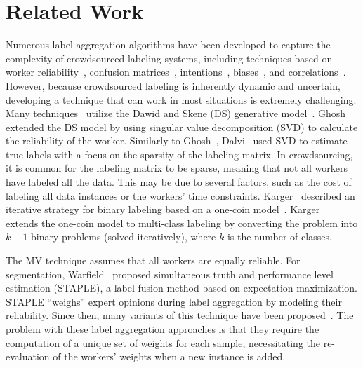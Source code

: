 \section{Related Work}\label{sec:crowd.relatedwork}
Numerous label aggregation algorithms have been developed to capture the complexity of crowdsourced labeling systems, including techniques based on worker reliability~\cite{bi_Learning_2014,demartini_Zencrowd_2012}, confusion matrices~\cite{raykar_Learning_2010,zhang_Spectral_2014}, intentions~\cite{bi_Learning_2014,kurve_MultiCategory_2015}, biases~\cite{zhang_Imbalanced_2013,hernandez-gonzalez_Note_2019, welinder_Multidimensional_2010}, and correlations~\cite{ma_Gradient_2020}. However, because crowdsourced labeling is inherently dynamic and uncertain, developing a technique that can work in most situations is extremely challenging. Many techniques~\cite{liu_Variational_2012,karger_Budget_2014,raykar_Learning_2010,dalvi_Aggregating_2013,ghosh_Who_2011} utilize the Dawid and Skene (DS) generative model~\cite{dawid_Maximum_1979}. Ghosh~\cite{ghosh_Who_2011} extended the DS model by using singular value decomposition (SVD) to calculate the reliability of the worker. Similarly to Ghosh~\cite{ghosh_Who_2011}, Dalvi~\cite{dalvi_Aggregating_2013} used SVD to estimate true labels with a focus on the sparsity of the labeling matrix. In crowdsourcing, it is common for the labeling matrix to be sparse, meaning that not all workers have labeled all the data. This may be due to several factors, such as the cost of labeling all data instances or the workers' time constraints. Karger~\cite{karger_Budget_2014} described an iterative strategy for binary labeling based on a one-coin model~\cite{ghosh_Who_2011}. Karger~\cite{karger_Budget_2014} extends the one-coin model to multi-class labeling by converting the problem into $k-1 $ binary problems (solved iteratively), where $k $ is the number of classes.

The MV technique assumes that all workers are equally reliable. For segmentation, Warfield~\cite{warfield_Simultaneous_2004} proposed simultaneous truth and performance level estimation (STAPLE), a label fusion method based on expectation maximization. STAPLE ``weighs'' expert opinions during label aggregation by modeling their reliability. Since then, many variants of this technique have been proposed~\cite{winzeck_ISLES_2018,commowick_Objective_2018,asman_Robust_2011,asman_Formulating_2012, eugenioiglesias_Unified_2013, jorgecardoso_STEPS_2013,asman_NonLocal_2013,akhondi-asl_Logarithmic_2014}. The problem with these label aggregation approaches is that they require the computation of a unique set of weights for each sample, necessitating the re-evaluation of the workers' weights when a new instance is added.

